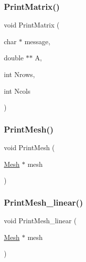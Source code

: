 \mbox{\label{a00554_a75942b12ae1b0172595c4d482b8203c0}} 
\subsubsection{\texorpdfstring{Print\+Matrix()}{PrintMatrix()}}
{\footnotesize\ttfamily void Print\+Matrix (\begin{DoxyParamCaption}\item[{char $\ast$}]{message,  }\item[{double $\ast$$\ast$}]{A,  }\item[{int}]{Nrows,  }\item[{int}]{Ncols }\end{DoxyParamCaption})}

\mbox{\label{a00554_ad62a25bbacac8912e4932b3163c885f0}} 
\subsubsection{\texorpdfstring{Print\+Mesh()}{PrintMesh()}}
{\footnotesize\ttfamily void Print\+Mesh (\begin{DoxyParamCaption}\item[{\hyperlink{a00557_aeffbe0891ab73a4d8964c9cb7978426e}{Mesh} $\ast$}]{mesh }\end{DoxyParamCaption})}

\mbox{\label{a00554_a0f8fa1f045215f1ea478f91156eb0317}} 
\subsubsection{\texorpdfstring{Print\+Mesh\+\_\+linear()}{PrintMesh\_linear()}}
{\footnotesize\ttfamily void Print\+Mesh\+\_\+linear (\begin{DoxyParamCaption}\item[{\hyperlink{a00557_aeffbe0891ab73a4d8964c9cb7978426e}{Mesh} $\ast$}]{mesh }\end{DoxyParamCaption})}

\mbox{\label{a00554_af31fd6654ededed596d98c090d8748b5}} 
